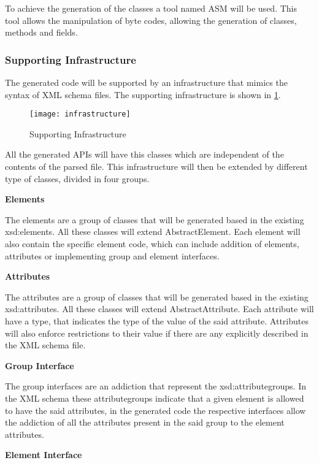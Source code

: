 \noindent
To achieve the generation of the classes a tool named ASM will be used. This tool allows the manipulation of byte codes, allowing the generation of classes, methods and fields. 

\newpage

\subsubsection{Supporting Infrastructure}

The generated code will be supported by an infrastructure that mimics the syntax of XML schema files. The supporting infrastructure is shown in \ref{Infrastructure}.

\begin{figure}[h]
	\centering
	\texttt{[image: infrastructure]}
	\caption{Supporting Infrastructure}
	\label{Infrastructure}
\end{figure}

\noindent
All the generated APIs will have this classes which are independent of the contents of the parsed file. This infrastructure will then be extended by different type of classes, divided in four groups.

\textbf{Elements}

The elements are a group of classes that will be generated based in the existing xsd:elements. All these classes will extend AbstractElement. Each element will also contain the specific element code, which can include addition of elements, attributes or implementing group and element interfaces.

\textbf{Attributes}

The attributes are a group of classes that will be generated based in the existing xsd:attributes. All these classes will extend AbstractAttribute. Each attribute will have a type, that indicates the type of the value of the said attribute. Attributes will also enforce restrictions to their value if there are any explicitly described in the XML schema file.

\textbf{Group Interface}

The group interfaces are an addiction that represent the xsd:attributegroups. In the XML schema these attributegroups indicate that a given element is allowed to have the said attributes, in the generated code the respective interfaces allow the addiction of all the attributes present in the said group to the element attributes.

\textbf{Element Interface}

